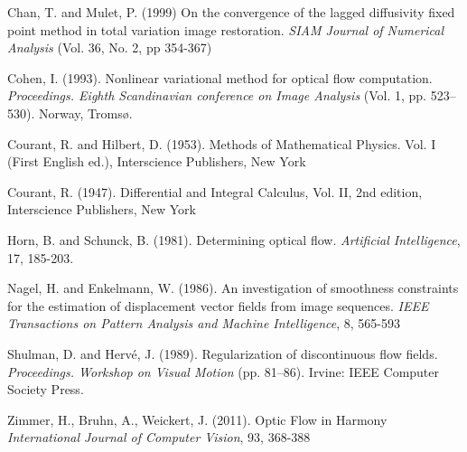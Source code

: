 \documentclass[10pt,a4paper]{article}
\begin{document}
\begin{thebibliography}{}

Chan, T. and Mulet, P. (1999) On the convergence of the lagged diffusivity fixed point method in total variation image restoration. \emph{SIAM Journal of Numerical Analysis} (Vol. 36, No. 2, pp 354-367)

Cohen, I. (1993). Nonlinear variational method for optical flow computation. \emph{Proceedings. Eighth Scandinavian conference on Image Analysis} (Vol. 1, pp. 523–530). Norway, Tromsø.

Courant, R. and Hilbert, D. (1953). Methods of Mathematical Physics. Vol. I (First English ed.), Interscience Publishers, New York

Courant, R. (1947). Differential and Integral Calculus, Vol. II, 2nd edition, Interscience Publishers, New York


Horn, B. and Schunck, B. (1981). Determining optical flow. \emph{Artificial Intelligence}, 17, 185-203.

Nagel, H. and Enkelmann, W. (1986). An investigation of smoothness constraints for the estimation of displacement vector fields from image sequences. \emph{IEEE Transactions on Pattern Analysis and Machine Intelligence}, 8, 565-593

Shulman, D. and Hervé, J. (1989). Regularization of discontinuous flow fields. \emph{Proceedings. Workshop on Visual Motion} (pp. 81–86). Irvine: IEEE Computer Society Press.

Zimmer, H., Bruhn, A., Weickert, J. (2011). Optic Flow in Harmony \emph{International Journal of Computer Vision}, 93, 368-388


\end{thebibliography}
\end{document}
